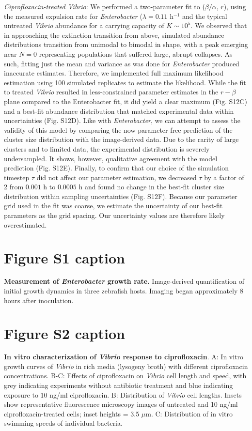 \textit{Ciprofloxacin-treated Vibrio}: We performed a two-parameter fit to ($\beta/\alpha$, $r$), using the measured expulsion rate for \textit{Enterobacter} ($\lambda = 0.11$ h$^{-1}$ and the typical untreated \textit{Vibrio} abundance for a carrying capacity of $K \sim 10^5$. We observed that in approaching the extinction transition from above, simulated abundance distributions transition from unimodal to bimodal in shape, with a peak emerging near $N=0$ representing populations that suffered large, abrupt collapses. As such, fitting just the mean and variance as was done for \textit{Enterobacter} produced inaccurate estimates. Therefore, we implemented full maximum likelihood estimation using 100 simulated replicates to estimate the likelihood. While the fit to treated \textit{Vibrio} resulted in less-constrained parameter estimates in the $r-\beta$ plane compared to the Enterobacter fit, it did yield a clear maximum (Fig. S12C) and a best-fit abundance distribution that matched experimental data within uncertainties (Fig. S12D). Like with \textit{Enterobacter}, we can attempt to assess the validity of this model by comparing the now-parameter-free prediction of the cluster size distribution with the image-derived data. Due to the rarity of large clusters and to limited data, the experimental distribution is severely undersampled. It shows, however, qualitative agreement with the model prediction (Fig. S12E). Finally, to confirm that our choice of the simulation timestep $\tau$ did not affect our parameter estimation, we decreased $\tau$ by a factor of 2 from $0.001$ h to $0.0005$ h and found no change in the best-fit cluster size distribution within sampling uncertainties (Fig. S12F). Because our parameter grid used in the fit was coarse, we estimate the uncertainty of our best-fit parameters as the grid spacing. Our uncertainty values are therefore likely overestimated.



\newpage
\section*{Figure S1 caption}
\textbf{Measurement of \textit{Enterobacter} growth rate.} Image-derived quantification of initial growth dynamics in three zebrafish hosts. Imaging began approximately 8 hours after inoculation. 

\section*{Figure S2 caption}
\textbf{In vitro characterization of \textit{Vibrio} response to ciprofloxacin}. A: In vitro growth curves of \textit{Vibrio} in rich media (lysogeny broth) with different ciprofloxacin concentrations. B-C: Effects of ciprofloxacin on \textit{Vibrio} cell length and speed, with grey indicating experiments without antibiotic treatment and blue indicating exposure to 10 ng/ml ciprofloxacin. B: Distribution of \textit{Vibrio} cell lengths. Insets show representative fluorescence microscopy images of untreated and 10 ng/ml ciprofloxacin-treated cells; inset heights = 3.5 $\mu$m. C: Distribution of in vitro swimming speeds of individual bacteria.

